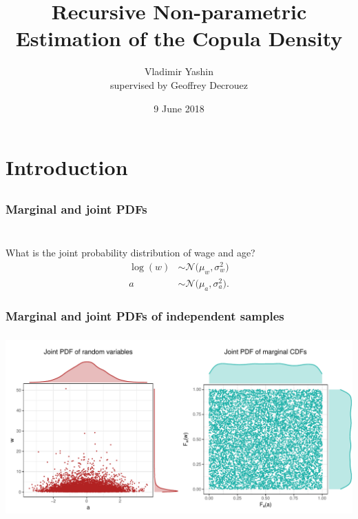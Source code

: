 \documentclass[aspectratio=169]{beamer}
\author{Vladimir Yashin\\ supervised by Geoffrey Decrouez}
\title{Recursive Non-parametric Estimation of the Copula Density}
\institute{Higher School of Economics}
\date{9 June 2018}
\begin{document}
	\maketitle
	
\section{Introduction}
	\subsection{}
		\subsubsection{Marginal and joint PDFs}
			\begin{frame}
				\frametitle{\insertsubsubsection}
				~\\[1em]
				\onslide<1-> What is the joint probability distribution of wage and age?
				\begin{align}
					\log(w)&\sim\mathcal{N}\big(\mu_w, \sigma_w^2\big) \\
					a&\sim\mathcal{N}\big(\mu_a, \sigma_a^2\big).
				\end{align}

			\end{frame}
		
		\subsubsection{Marginal and joint PDFs of independent samples}
			\begin{frame}
				\frametitle{\insertsubsubsection}				
				
				\onslide<1-> 
				\begin{center}
					\includegraphics[width=0.95\linewidth]{plots/introduction/indep}
				\end{center}
				
			\end{frame}
			
\end{document}
